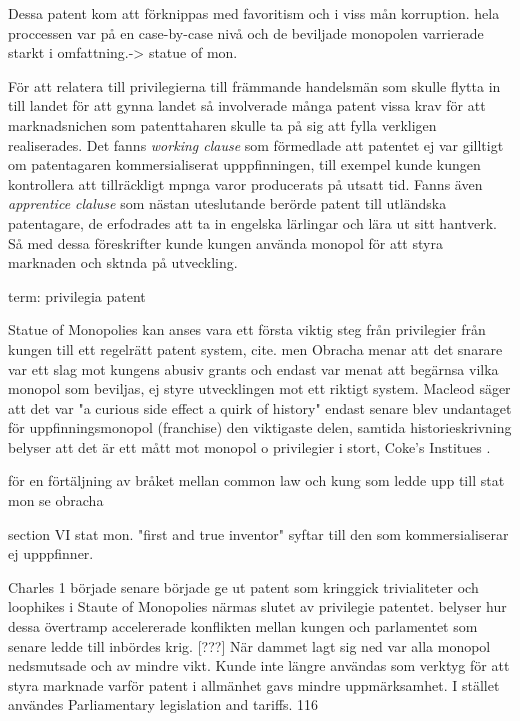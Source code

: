 Dessa patent kom att förknippas med favoritism och i viss mån korruption. hela proccessen var på en
case-by-case nivå och de beviljade monopolen varrierade starkt i omfattning.-> statue of mon.

För att relatera till privilegierna till främmande handelsmän som skulle flytta in till landet för att
gynna landet så involverade många patent vissa krav för att marknadsnichen som patenttaharen skulle ta på
sig att fylla verkligen realiserades. Det fanns \emph{working clause} som förmedlade att patentet ej var
gilltigt om patentagaren kommersialiserat upppfinningen, till exempel kunde kungen kontrollera att
tillräckligt mpnga varor producerats på utsatt tid. Fanns även \emph{apprentice claluse} som nästan
uteslutande berörde patent till utländska patentagare, de erfodrades att ta in engelska lärlingar och
lära ut sitt hantverk. Så med dessa föreskrifter kunde kungen använda monopol för att styra marknaden och
sktnda på utveckling.

term: privilegia patent

Statue of Monopolies kan anses vara ett första viktig steg från privilegier från kungen till ett
regelrätt patent system, cite. men Obracha menar att det snarare var ett slag mot kungens abusiv grants
och endast var menat att begärnsa vilka monopol som beviljas, ej styre utvecklingen mot ett riktigt
system. Macleod \cite{macleod2} säger att det var "a curious side effect a quirk of history" endast
senare blev undantaget för uppfinningsmonopol (franchise) den viktigaste delen, samtida historieskrivning
belyser att det är ett mått mot monopol o privilegier i stort, Coke's Institues \cite{coke}.

för en förtäljning av bråket mellan common law och kung som ledde upp till stat mon se obracha

section VI stat mon. "first and true inventor" syftar till den som kommersialiserar ej upppfinner.

Charles 1 började senare började ge ut patent som kringgick trivialiteter och loophikes i Staute of
Monopolies närmas slutet av privilegie patentet. \cite{Fox} belyser hur dessa övertramp accelererade
konflikten mellan kungen och parlamentet som senare ledde till inbördes krig. [???] När dammet lagt sig
ned var alla monopol nedsmutsade och av mindre vikt. Kunde inte längre användas som verktyg för att styra
marknade varför patent i allmänhet gavs mindre uppmärksamhet. I stället användes Parliamentary
legislation and tariffs. 116

